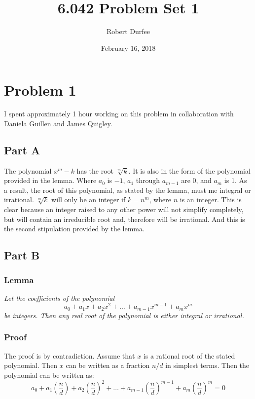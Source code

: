\documentclass{article}
\title{ 6.042 Problem Set 1 }
\author{ Robert Durfee }
\date{ February 16, 2018 }
\begin{document}
\maketitle

\section*{Problem 1 }

I spent approximately 1 hour working on this problem in collaboration with
Daniela Guillen and James Quigley.

\subsection*{Part A}

The polynomial $ x^{m} - k $ has the root $\sqrt[m]{k}$. It is also in the form
of the polynomial provided in the lemma.  Where $a_{0}$ is $-1$, $a_{1}$ through
$a_{m-1}$ are 0, and $a_{m}$ is 1. As a result, the root of this polynomial, as
stated by the lemma, must me integral or irrational. $\sqrt[m]{k}$ will only be
an integer if $k = n^{m}$, where $n$ is an integer. This is clear because an
integer raised to any other power will not simplify completely, but will contain
an irreducible root and, therefore will be irrational.  And this is the second
stipulation provided by the lemma.

\subsection*{Part B}

\subsubsection*{Lemma}

\textit{Let the coefficients of the polynomial}
$$ a_{0} + a_{1}x + a_{2}x^{2} + \ldots + a_{m-1}x^{m-1} + a_{m}x^{m} $$
\textit{be integers. Then any real root of the polynomial is either integral or
irrational.}

\subsubsection*{Proof}

The proof is by contradiction. Assume that $x$ is a rational root of the stated
polynomial. Then $x$ can be written as a fraction $n/d$ in simplest terms. Then
the polynomial can be written as:
$$ a_{0} + a_{1} \left(\frac{ n }{ d }\right) + a_{2}\left(\frac{ n }{ d
}\right)^{2} + \dots + a_{m-1}\left(\frac{ n }{ d }\right)^{m-1} +
a_{m}\left(\frac{ n }{ d }\right)^{m} = 0 $$
\end{document}
